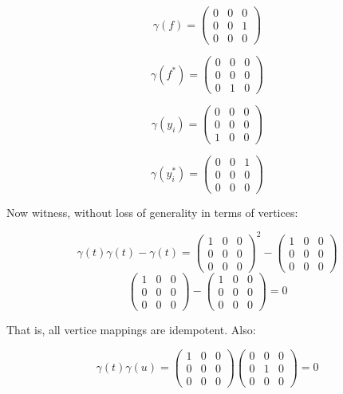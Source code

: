 \begin{solution}
    $$\gamma(f)=\left(\begin{array}{ccc} 0 & 0 & 0 \\ 0 & 0 & 1 \\ 0 & 0 & 0 \end{array}\right)$$

    $$\gamma(f^*)=\left(\begin{array}{ccc} 0 & 0 & 0 \\ 0 & 0 & 0 \\ 0 & 1 & 0 \end{array}\right)$$

    $$\gamma(y_i)=\left(\begin{array}{ccc} 0 & 0 & 0 \\ 0 & 0 & 0 \\ 1 & 0 & 0 \end{array}\right)$$

    $$\gamma(y_i^*)=\left(\begin{array}{ccc} 0 & 0 & 1 \\ 0 & 0 & 0 \\ 0 & 0 & 0 \end{array}\right)$$

    Now witness, without loss of generality in terms of vertices:

    $$\gamma(t)\gamma(t)-\gamma(t)=\left(\begin{array}{ccc} 1 & 0 & 0 \\ 0 & 0 & 0 \\ 0 & 0 & 0 \end{array}\right)^2
    -\left(\begin{array}{ccc} 1 & 0 & 0 \\ 0 & 0 & 0 \\ 0 & 0 & 0 \end{array}\right)$$
    $$\left(\begin{array}{ccc} 1 & 0 & 0 \\ 0 & 0 & 0 \\ 0 & 0 & 0 \end{array}\right)-
    \left(\begin{array}{ccc} 1 & 0 & 0 \\ 0 & 0 & 0 \\ 0 & 0 & 0 \end{array}\right)=0$$

    That is, all vertice mappings are idempotent. Also:

    $$\gamma(t)\gamma(u)=\left(\begin{array}{ccc} 1 & 0 & 0 \\ 0 & 0 & 0 \\ 0 & 0 & 0 \end{array}\right)
    \left(\begin{array}{ccc} 0 & 0 & 0 \\ 0 & 1 & 0 \\ 0 & 0 & 0 \end{array}\right)=0$$


\end{solution}
